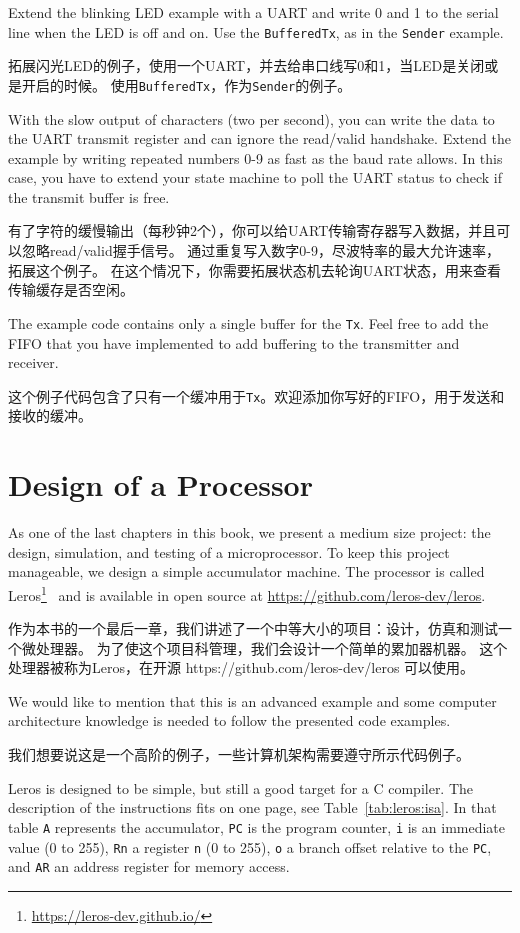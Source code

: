 \documentclass[%
    10pt,
    headinclude, footexclude,
    openright, %
    notitlepage,
    cleardoubleempty,
    headsepline,
    pointlessnumbers,
    bibtotoc, idxtotoc,
    ]{scrbook}
\newcommand{\code}[1]{{\small{\texttt{#1}}}}
\newcommand{\myref}[2]{\href{#1}{#2}}
\renewcommand{\myref}[2]{{#2}{\footnote{\url{#1}}}}
\begin{document}
Extend the blinking LED example with a UART and write 0 and 1 to the serial
line when the LED is off and on. Use the \code{BufferedTx}, as in the \code{Sender}
example.

拓展闪光LED的例子，使用一个UART，并去给串口线写0和1，当LED是关闭或是开启的时候。
使用\code{BufferedTx}，作为\code{Sender}的例子。

With the slow output of characters (two per second), you can write the data
to the UART transmit register and can ignore the read/valid handshake.
Extend the example by writing repeated numbers 0-9 as fast as the baud rate allows.
In this case, you have to extend your state machine to poll the UART status
to check if the transmit buffer is free.

有了字符的缓慢输出（每秒钟2个），你可以给UART传输寄存器写入数据，并且可以忽略read/valid握手信号。
通过重复写入数字0-9，尽波特率的最大允许速率，拓展这个例子。
在这个情况下，你需要拓展状态机去轮询UART状态，用来查看传输缓存是否空闲。

The example code contains only a single buffer for the \code{Tx}. Feel free to
add the FIFO that you have implemented to add buffering to the transmitter
and receiver. 

这个例子代码包含了只有一个缓冲用于\code{Tx}。欢迎添加你写好的FIFO，用于发送和接收的缓冲。

\chapter{Design of a Processor}

As one of the last chapters in this book, we present a medium size project:
the design, simulation, and testing of a microprocessor.
To keep this project manageable, we design a simple accumulator machine.
The processor is called \myref{https://leros-dev.github.io/}{Leros}~\cite{leros:arcs2019}
and is available in open source at \url{https://github.com/leros-dev/leros}.

作为本书的一个最后一章，我们讲述了一个中等大小的项目：设计，仿真和测试一个微处理器。
为了使这个项目科管理，我们会设计一个简单的累加器机器。
这个处理器被称为Leros，在开源 https://github.com/leros-dev/leros 可以使用。

We would like to mention that this is an advanced example and some computer
architecture knowledge is needed to follow the presented code examples.

我们想要说这是一个高阶的例子，一些计算机架构需要遵守所示代码例子。

Leros is designed to be simple, but still a good target for a C compiler.
The description of the instructions fits on one page, see Table~\ref{tab:leros:isa}.
In that table \code{A} represents the accumulator, \code{PC} is the program counter,
\code{i} is an immediate value (0 to 255), \code{Rn} a register
\code{n} (0 to 255), \code{o} a branch offset relative to the \code{PC},
and \code{AR} an address register for memory access.
\end{document}
